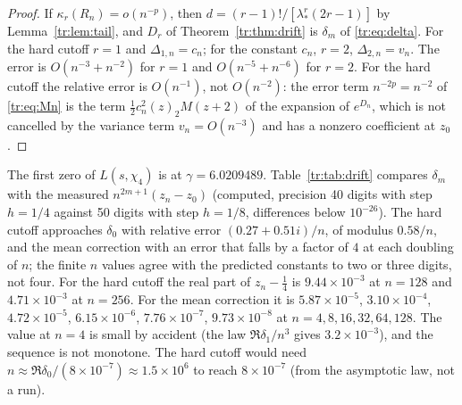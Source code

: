 \begin{proof}
If $\kappa_r(R_n)=o(n^{-p})$, then $d=(r-1)!/[\lambda_*^r(2r-1)]$ by Lemma~\ref{tr:lem:tail}, and $D_r$ of Theorem~\ref{tr:thm:drift} is $\delta_m$ of \eqref{tr:eq:delta}. For the hard cutoff $r=1$ and $\Delta_{1,n}=c_n$; for the constant $c_n$, $r=2$, $\Delta_{2,n}=v_n$. The error is $O(n^{-3}+n^{-2})$ for $r=1$ and $O(n^{-5}+n^{-6})$ for $r=2$. For the hard cutoff the relative error is $O(n^{-1})$, not $O(n^{-2})$: the error term $n^{-2p}=n^{-2}$ of \eqref{tr:eq:Mn} is the term $\frac12c_n^2(z)_2M(z+2)$ of the expansion of $e^{D_n}$, which is not cancelled by the variance term $v_n=O(n^{-3})$ and has a nonzero coefficient at $z_0$.
\end{proof}

The first zero of $L(s,\chi_4)$ is at $\gamma=6.0209489$. Table~\ref{tr:tab:drift} compares $\delta_m$ with the measured $n^{2m+1}(z_n-z_0)$ (computed, precision 40 digits with step $h=1/4$ against 50 digits with step $h=1/8$, differences below $10^{-26}$). The hard cutoff approaches $\delta_0$ with relative error $(0.27+0.51i)/n$, of modulus $0.58/n$, and the mean correction with an error that falls by a factor of $4$ at each doubling of $n$; the finite $n$ values agree with the predicted constants to two or three digits, not four. For the hard cutoff the real part of $z_n-\frac14$ is $9.44\times10^{-3}$ at $n=128$ and $4.71\times10^{-3}$ at $n=256$. For the mean correction it is $5.87\times10^{-5}$, $3.10\times10^{-4}$, $4.72\times10^{-5}$, $6.15\times10^{-6}$, $7.76\times10^{-7}$, $9.73\times10^{-8}$ at $n=4,8,16,32,64,128$. The value at $n=4$ is small by accident (the law $\Re\delta_1/n^3$ gives $3.2\times10^{-3}$), and the sequence is not monotone. The hard cutoff would need $n\approx\Re\delta_0/(8\times10^{-7})\approx1.5\times10^6$ to reach $8\times10^{-7}$ (from the asymptotic law, not a run).

\begin{table}[h]\centering\small
{}
\caption{The drift of the first zero of $M_n$ at $\gamma=6.0209489$ (computed). The last column is the gamma remainder of Proposition~\ref{tr:prop:gamma}, for which $\delta_2=-2.5713-1.0051i$ is not the limit.}\label{tr:tab:drift}
\end{table}

